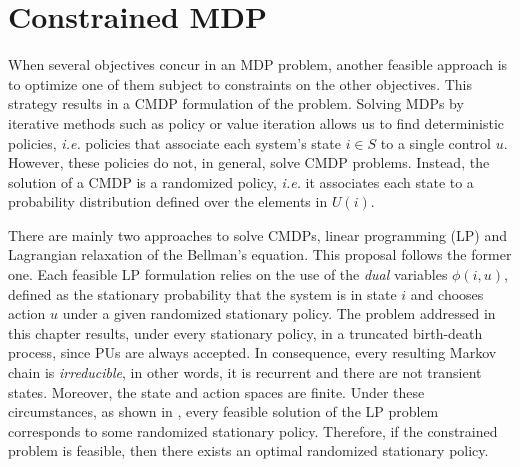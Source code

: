 \section{Constrained MDP}\label{sec:Constrained MDP}
When several objectives concur in an MDP problem, another feasible approach is to optimize one of them subject to constraints on the other objectives. This strategy results in a CMDP formulation of the problem. Solving MDPs by iterative methods such as policy or value iteration allows us to find deterministic policies, \textit{i.e.} policies that associate each system's state $i \in S$ to a single control $u$.
However, these policies do not, in general, solve CMDP problems. Instead, the solution of a CMDP is a randomized policy, \textit{i.e.} it associates each state to a probability distribution defined over the elements in $U(i)$.

There are mainly two approaches to solve CMDPs, linear programming (LP) and Lagrangian relaxation of the Bellman's equation. This proposal follows the former one. Each feasible LP formulation relies on the use of the \textit{dual} variables $\phi\left(i,u\right)$, defined as the stationary probability that the system is in state $i$ and chooses action $u$ under a given randomized stationary policy. The problem addressed in this chapter results, under every stationary policy, in a truncated birth-death process, since PUs are always accepted. In consequence, every resulting Markov chain is \textit{irreducible}, in other words, it is recurrent and there are not transient states. Moreover, the state and action spaces are finite.
Under these circumstances, as shown in \cite{ref:Puterman}, every feasible solution of the LP problem corresponds to some randomized stationary policy. Therefore, if the constrained problem is feasible, then there exists an optimal randomized stationary policy.

